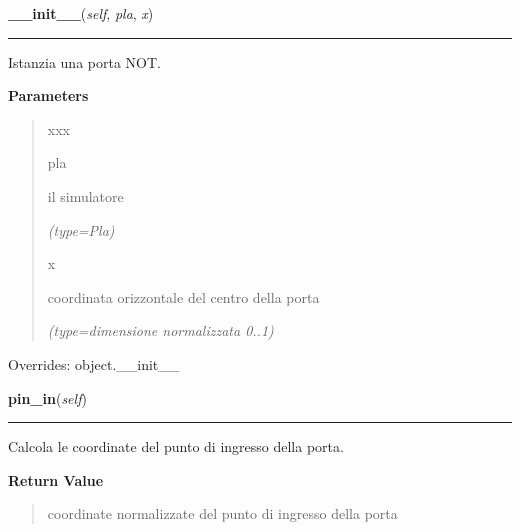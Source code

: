 \hspace{.8\funcindent}\begin{boxedminipage}{\funcwidth}

    \raggedright \textbf{\_\_init\_\_}(\textit{self}, \textit{pla}, \textit{x})

    \vspace{-1.5ex}

    \rule{\textwidth}{0.5\fboxrule}
\setlength{\parskip}{2ex}
    Istanzia una porta NOT.

\setlength{\parskip}{1ex}
      \textbf{Parameters}
      \vspace{-1ex}

      \begin{quote}
        \begin{Ventry}{xxx}

          \item[pla]

          il simulatore

            {\it (type=Pla)}

          \item[x]

          coordinata orizzontale del centro della porta

            {\it (type=dimensione normalizzata 0..1)}

        \end{Ventry}

      \end{quote}

      Overrides: object.\_\_init\_\_

    \end{boxedminipage}

    \label{component:Not:pin_in}

    \vspace{0.5ex}

\hspace{.8\funcindent}\begin{boxedminipage}{\funcwidth}

    \raggedright \textbf{pin\_in}(\textit{self})

    \vspace{-1.5ex}

    \rule{\textwidth}{0.5\fboxrule}
\setlength{\parskip}{2ex}
    Calcola le coordinate del punto di ingresso della porta.

\setlength{\parskip}{1ex}
      \textbf{Return Value}
    \vspace{-1ex}

      \begin{quote}
      coordinate normalizzate del punto di ingresso della porta

      \end{quote}

    \end{boxedminipage}

